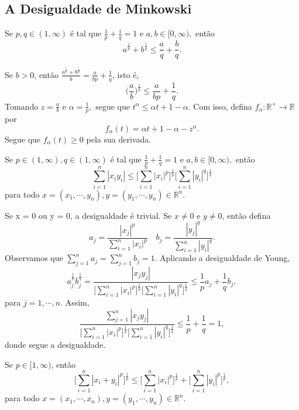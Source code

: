 \documentclass[metric_notes.tex]{subfiles}
\begin{document}
\subsection{A Desigualdade de Minkowski}
\begin{lemma*}
	Se \(p, q\in (1, \infty)\) é tal que \(\frac{1}{p} + \frac{1}{q} = 1\) e \(a, b\in [0, \infty),\) então
	\[
		a^{\frac{1}{p}} + b^{\frac{1}{q}}\leq \frac{a}{q} + \frac{b}{q}.
	\]
\end{lemma*}
\begin{proof*}
	Se \(b > 0\), então \(\frac{a^{\frac{1}{p}}+b^{\frac{1}{q}}}{b} = \frac{a}{bp} + \frac{1}{q}\), isto é,
	\[
		\biggl(\frac{a}{b}\biggr)^{\frac{1}{p}}\leq \frac{a}{bp} + \frac{1}{q}.
	\]
	Tomando \(z=\frac{a}{b}\) e \(\alpha =\frac{1}{p},\) segue que \(t^{\alpha }\leq \alpha t + 1 - \alpha.\) Com isso, defina
	\(f_{\alpha }:\mathbb{R}^{+}\rightarrow \mathbb{R}\) por
	\[
		f_{\alpha }(t) = \alpha t +1 - \alpha - z^{\alpha }.
	\]
	Segue que \(f_{\alpha }(t)\geq 0\) pela sua derivada. \qedsymbol
\end{proof*}
\begin{lemma*}
	Se \(p\in(1, \infty), q\in (1, \infty)\) é tal que \(\frac{1}{p}+\frac{1}{q}=1\) e \(a, b\in [0, \infty),\) então
	\[
		\sum\limits_{i=1}^{n}|x_{i}y_{i}|\leq \biggl[\sum\limits_{i=1}^{n}|x_{i}|^{p}\biggr]^{\frac{1}{p}}\biggl[\sum\limits_{i=1}^{n}|y_{i}|^{q}\biggr]^{\frac{1}{q}}
	\]
	para todo \(x=(x_{1}, \cdots, y_{n}), y=(y_{1}, \cdots, y_{n}) \in \mathbb{R}^{n}.\)
\end{lemma*}
\begin{proof*}
	Se x = 0 ou y = 0, a desigualdade é trivial. Se \(x\neq0\) e \(y\neq0\), então defina
	\[
		a_{j} = \frac{|x_{j}|^{p}}{\sum\limits_{i=1}^{n}|x_{i}|^{p}}\quad b_{j}=\frac{|y_{j}|^{q}}{\sum\limits_{i=1}^{n}|y_{i}|^{q}}.
	\]
	Observamos que \(\sum\limits_{j=1}^{n}a_{j} = \sum\limits_{j=1}^{n}b_{j}=1.\) Aplicando a desigualdade de Young,
	\[
		a_{j}^{\frac{1}{p}}b_{j}^{\frac{1}{q}} = \frac{|x_{j}y_{j}|}{\biggl[\sum\limits_{i=1}^{n}|x_{i}|^{p}\biggr]^{\frac{1}{p}}\biggl[\sum\limits_{i=1}^{n}|y_{i}|^{q}\biggr]^{\frac{1}{q}}}\leq \frac{1}{p}a_{j} + \frac{1}{q}b_{j},
	\]
	para \(j=1, \cdots, n.\) Assim,
	\[
		\frac{\sum\limits_{j=1}^{n}|x_{j}y_{j}|}{\biggl[\sum\limits_{i=1}^{n}|x_{i}|^{p}\biggr]^{\frac{1}{p}}\biggl[\sum\limits_{i=1}^{n}|y_{i}|^{q}\biggr]^{\frac{1}{q}}}\leq \frac{1}{p} + \frac{1}{q}=1,
	\]
	donde segue a desigualdade. \qedsymbol
\end{proof*}
\begin{prop*}
	Se \(p\in[1, \infty)\), então
	\[
		\biggl[\sum\limits_{i=1}^{n}|x_{i}+y_{i}|^{p}\biggr]^{\frac{1}{p}}\leq \biggl[\sum\limits_{i=1}^{n}|x_{i}|^{p}\biggr]^{\frac{1}{p}} + \biggl[\sum\limits_{i=1}^{n}|y_{i}|^{p}\biggr]^{\frac{1}{p}},
	\]
	para todo \(x=(x_{1}, \cdots, x_{n}), y=(y_{1}, \cdots, y_{n})\in \mathbb{R}^{n}\).
\end{prop*}
\end{document}

